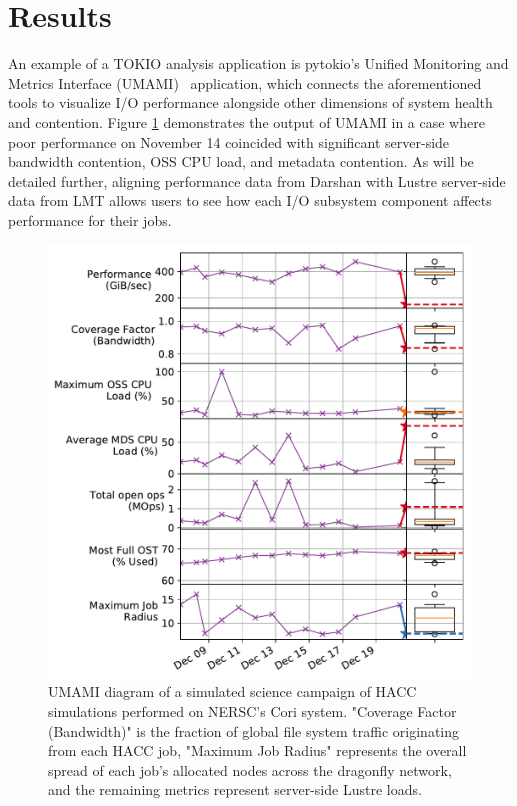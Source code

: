 \section{Results}

An example of a TOKIO analysis application is pytokio's Unified Monitoring and Metrics Interface (UMAMI)~\cite{Lockwood2017} application, which connects the aforementioned tools to visualize I/O performance alongside other dimensions of system health and contention.  Figure \ref{fig:umami} demonstrates the output of UMAMI in a case where poor performance on November 14 coincided with significant server-side bandwidth contention, OSS CPU load, and metadata contention.  As will be detailed further, aligning performance data from Darshan with Lustre server-side data from LMT allows users to see how each I/O subsystem component affects performance for their jobs.
% 
% 

\begin{figure}[t]
    \centering
    \includegraphics[width=1.0\columnwidth]{umami}
    \vspace{-.3in}
    \caption{UMAMI diagram of a simulated science campaign of HACC~\cite{Habib2012} simulations performed on NERSC's Cori system.  "Coverage Factor (Bandwidth)" is the fraction of global file system traffic originating from each HACC job, "Maximum Job Radius" represents the overall spread of each job's allocated nodes across the dragonfly network, and the remaining metrics represent server-side Lustre loads.}
    \label{fig:umami}
    \vspace{-.2in}
\end{figure}

